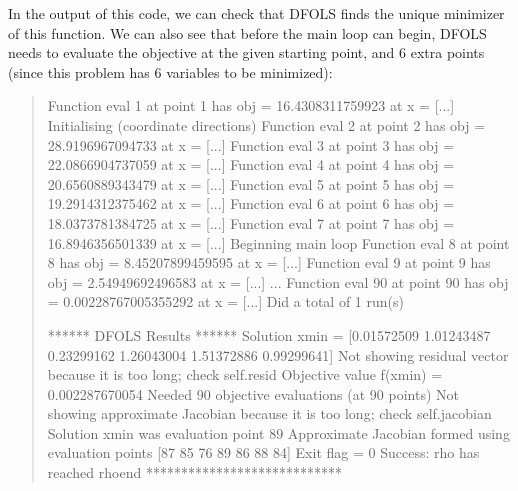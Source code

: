 \documentclass[letterpaper,10pt,english]{sphinxmanual}
\begin{document}
\begin{quote}
\begin{sphinxVerbatim}[commandchars=\\\{\}]
  
     

 

   

\end{sphinxVerbatim}
\end{quote}

\sphinxAtStartPar
In the output of this code, we can check that DFO\sphinxhyphen{}LS finds the unique minimizer of this function. We can also see that before the main loop can begin,
DFO\sphinxhyphen{}LS needs to evaluate the objective at the given starting point, and 6 extra points (since this problem has 6 variables to be minimized):
\begin{quote}

\begin{sphinxVerbatim}[commandchars=\\\{\}]
Function eval 1 at point 1 has obj = 16.4308311759923 at x = [...]
Initialising (coordinate directions)
Function eval 2 at point 2 has obj = 28.9196967094733 at x = [...]
Function eval 3 at point 3 has obj = 22.0866904737059 at x = [...]
Function eval 4 at point 4 has obj = 20.6560889343479 at x = [...]
Function eval 5 at point 5 has obj = 19.2914312375462 at x = [...]
Function eval 6 at point 6 has obj = 18.0373781384725 at x = [...]
Function eval 7 at point 7 has obj = 16.8946356501339 at x = [...]
Beginning main loop
Function eval 8 at point 8 has obj = 8.45207899459595 at x = [...]
Function eval 9 at point 9 has obj = 2.54949692496583 at x = [...]
...
Function eval 90 at point 90 has obj = 0.00228767005355292 at x = [...]
Did a total of 1 run(s)

****** DFO\PYGZhy{}LS Results ******
Solution xmin = [\PYGZhy{}0.01572509  1.01243487 \PYGZhy{}0.23299162  1.26043004 \PYGZhy{}1.51372886  0.99299641]
Not showing residual vector because it is too long; check self.resid
Objective value f(xmin) = 0.002287670054
Needed 90 objective evaluations (at 90 points)
Not showing approximate Jacobian because it is too long; check self.jacobian
Solution xmin was evaluation point 89
Approximate Jacobian formed using evaluation points [87 85 76 89 86 88 84]
Exit flag = 0
Success: rho has reached rhoend
****************************
\end{sphinxVerbatim}
\end{quote}
\end{document}
